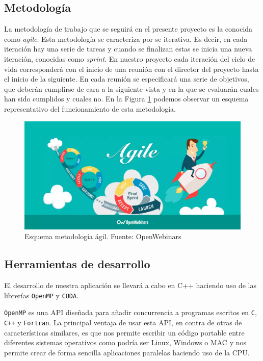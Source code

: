 \documentclass[titlepage,12pt]{report}
\begin{document}
\subsection{Metodología}

La metodología de trabajo que se seguirá en el presente proyecto es la conocida como \textit{agile}. Esta metodología se caracteriza por se iterativa. Es decir, en cada iteración hay una serie de tareas y cuando se finalizan estas se inicia una nueva iteración, conocidas como \textit{sprint}. En nuestro proyecto cada iteración del ciclo de vida corresponderá con el inicio de una reunión con el director del proyecto hasta el inicio de la siguiente. En cada reunión se especificará una serie de objetivos, que deberán cumplirse de cara a la siguiente vista y en la que se evaluarán cuales han sido cumplidos y cuales no. En la Figura \ref{agile} podemos observar un esquema representativo del funcionamiento de esta metodología.

\begin{figure}[ht]
	\centering
	\includegraphics[scale=0.25]{media/agile.png}
	\caption{Esquema metodología ágil. Fuente: OpenWebinars}
	\label{agile}
\end{figure}

\subsection{Herramientas de desarrollo}

El desarrollo de nuestra aplicación se llevará a cabo en C++ haciendo uso de las librerías \texttt{OpenMP} y \texttt{CUDA}. 

\texttt{OpenMP} es una API diseñada para añadir concurrencia a programas escritos en \texttt{C}, \texttt{C++} y \texttt{Fortran}. La principal ventaja de usar esta API, en contra de otras de características similares, es que nos permite escribir un código portable entre diferentes sistemas operativos como podría ser Linux, Windows o MAC y nos permite crear de forma sencilla aplicaciones paralelas haciendo uso de la CPU.
\end{document}
